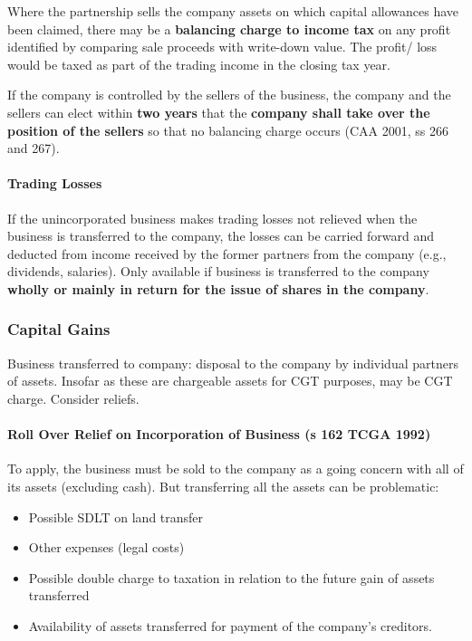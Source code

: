\documentclass[
]{article}
\providecommand{\tightlist}{%
  \setlength{\itemsep}{0pt}\setlength{\parskip}{0pt}}
\begin{document}
Where the partnership sells the company assets on which capital
allowances have been claimed, there may be a \textbf{balancing charge to
income tax} on any profit identified by comparing sale proceeds with
write-down value. The profit/ loss would be taxed as part of the trading
income in the closing tax year.

If the company is controlled by the sellers of the business, the company
and the sellers can elect within \textbf{two years} that the
\textbf{company shall take over the position of the sellers} so that no
balancing charge occurs (CAA 2001, ss 266 and 267).

\hypertarget{trading-losses}{%
\paragraph{Trading Losses}\label{trading-losses}}

If the unincorporated business makes trading losses not relieved when
the business is transferred to the company, the losses can be carried
forward and deducted from income received by the former partners from
the company (e.g., dividends, salaries). Only available if business is
transferred to the company \textbf{wholly or mainly in return for the
issue of shares in the company}.

\hypertarget{capital-gains}{%
\subsubsection{Capital Gains}\label{capital-gains}}

Business transferred to company: disposal to the company by individual
partners of assets. Insofar as these are chargeable assets for CGT
purposes, may be CGT charge. Consider reliefs.

\hypertarget{roll-over-relief-on-incorporation-of-business-s-162-tcga-1992}{%
\paragraph{Roll Over Relief on Incorporation of Business (s 162 TCGA
1992)}\label{roll-over-relief-on-incorporation-of-business-s-162-tcga-1992}}

To apply, the business must be sold to the company as a going concern
with all of its assets (excluding cash). But transferring all the assets
can be problematic:

\begin{itemize}
\tightlist
\item
  Possible SDLT on land transfer
\item
  Other expenses (legal costs)
\item
  Possible double charge to taxation in relation to the future gain of
  assets transferred
\item
  Availability of assets transferred for payment of the company's
  creditors.
\end{itemize}
\end{document}
